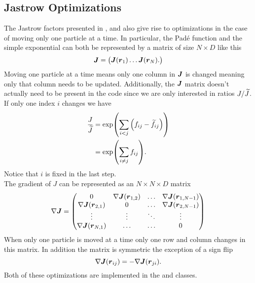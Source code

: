 \subsection{Jastrow Optimizations\label{susec:jastopt}}
    The Jastrow factors presented in ,
     and  also give rise to
    optimizations in the case of moving only one particle at a time. In
    particular, the Pad\'e function and the simple exponential can both be
    represented by a matrix of size $N\times D$ like this
        \begin{equation}
            \blds{J} = 
                \begin{pmatrix}
                    \blds{J}(\blds{r}_1) \dots \blds{J}(\blds{r}_N).
                \end{pmatrix}
        \end{equation}
    Moving one particle at a time means only one column in $\boldsymbol{{J}}$ is
    changed meaning only that column needs to be updated. Additionally, the
    $\boldsymbol{{J}}$ matrix doesn't actually need to be present in the code since we
    are only interested in ratios $J/\widetilde{J}$. If only one index $i$ changes
    we have
        \begin{align}
            \frac{J}{\widetilde{J}} &= \exp(\sum\limits_{i<j} \left(f_{ij} - \widetilde{f}_{ij}\right))
            \nonumber \\
            &= \exp(\sum\limits_{i\neq j} f_{ij}).
        \end{align}
    Notice that $i$ is fixed in the last step. \\
    The gradient of $J$ can be represented as an $N\times N\times D$ matrix
        \begin{equation}
            \nabla \boldsymbol{{J}} = 
                \begin{pmatrix}
                    0 & \nabla \boldsymbol{{J}}(\boldsymbol{{r}}_{1,2}) & \dots & \nabla
                    \boldsymbol{{J}}(\boldsymbol{{r}}_{1,N-1}) \\
                    \nabla \boldsymbol{{J}}(\boldsymbol{{r}}_{2,1}) & 0 & \dots & \nabla
                    \boldsymbol{{J}}(\boldsymbol{{r}}_{2,N-1}) \\
                    \vdots & \vdots & \ddots & \vdots \\
                    \nabla \boldsymbol{{J}}(\boldsymbol{{r}}_{N,1}) & \dots & \dots & 0 
                \end{pmatrix}
        \end{equation}
    When only one particle is moved at a time only one row and column changes
    in this matrix. In addition the matrix is symmetric the exception of a sign
    flip
        \begin{equation}
            \nabla \boldsymbol{{J}}(\boldsymbol{{r}}_{ij}) = -\nabla\boldsymbol{{J}}(\boldsymbol{{r}}_{ji}).
        \end{equation}
    Both of these optimizations are implemented in the 
    and  classes. \\ 

